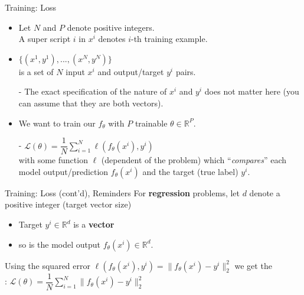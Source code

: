 \begin{frame}{Training: Loss}
\begin{itemize}
\item Let $N$ and $P$ denote positive integers.\\
A super script $i$ in $x^i$ denotes $i$-th training example.
\item {} $\{(x^1, y^1), ..., (x^N, y^N)\}$\\
is a set of $N$ input $x^i$ and output/target $y^i$ pairs.
\item[-] The exact specification of the nature of $x^i$ and $y^i$ does not matter here (you can assume that they are both vectors).
\pause
\item We want to train our  $f_{\theta}$ with $P$ trainable  $\theta \in \mathbb{R}^P$.
\item[-]  $\displaystyle \mathcal{L(\theta)} = \dfrac{1}{N} \sum_{i=1}^N \ell\left(f_{\theta}(x^i), y^i\right)$\\
with some function $\ell$ (dependent of the problem) which ``\textit{compares}'' each model output/prediction $f_{\theta}(x^i)$ and the target (true label) $y^i$.
\end{itemize}
\end{frame}

\begin{frame}{Training: Loss (cont'd), Reminders}
\vspace{-5mm}
For \textbf{regression} problems, let $d$ denote a positive integer (target vector size)
\begin{itemize}
\item Target $y^i  \in \mathbb{R}^d$ is a \textbf{vector}
\item so is the model output $f_{\theta}(x^i) \in \mathbb{R}^d$.\\
\vsp
\end{itemize}
Using the squared error
$\ell\left(f_{\theta}(x^i), y^i\right) = \|f_{\theta}(x^i) - y^i  \|^2_2$ we get the\\
: $\displaystyle \mathcal{L(\theta)} = \dfrac{1}{N} \sum_{i=1}^N \|f_{\theta}(x^i) - y^i  \|_2^2$
\end{frame}

